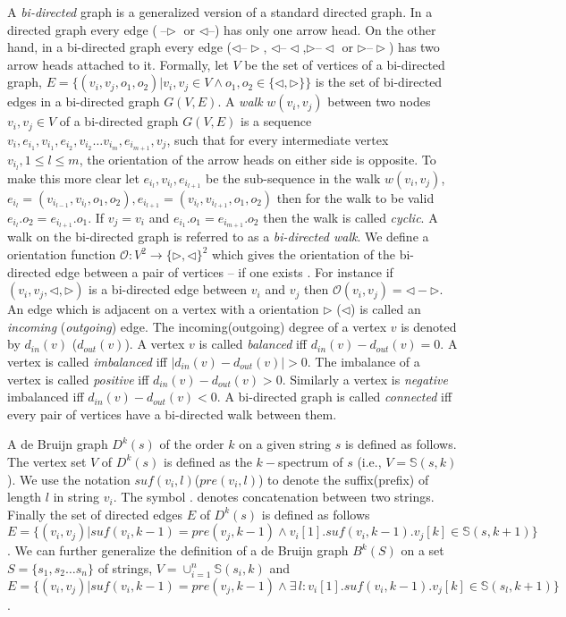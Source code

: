 \documentclass[runningheads]{llncs}
\begin{document}
A {\em bi-directed} graph is a generalized version of a standard directed graph. In a directed graph every 
edge ($\text{--}\rhd$ or $\lhd\text{--}$) has only one arrow head. On the other hand, in a bi-directed graph 
every edge ($\lhd\text{--}\rhd$, $\lhd\text{--}\lhd$,$\rhd\text{--}\lhd$ or $\rhd\text{--}\rhd$) has two arrow 
heads attached to it. Formally, let $V$ be the set of vertices of a bi-directed graph, $E = \{(v_i,v_j,o_1,o_2) | v_i,v_j\in V \wedge o_1,o_2\in\{\lhd,\rhd\}\}$ is the set of bi-directed edges in a bi-directed graph $G(V,E)$. 
A {\em walk} $w(v_i,v_j)$ between two nodes $v_i,v_j \in V$ of a bi-directed graph $G(V,E)$ is a
sequence $v_i,e_{i_1},v_{i_1},e_{i_2},v_{i_2}\ldots v_{i_m},e_{i_{m+1}},v_j$, such that for 
every intermediate vertex $v_{i_l},1\leq l \leq m$, the orientation of the arrow heads on either side is opposite. To make this more clear let $e_{i_l},v_{i_l},e_{i_{l+1}}$ be the sub-sequence in the walk $w(v_i,v_j)$,
$e_{i_l}=(v_{i_{l-1}},v_{i_l},o_1,o_2), e_{i_{l+1}} = (v_{i_{l}},v_{i_{l+1}},o_1,o_2)$
then for the walk to be valid $e_{i_l}.o_2 = e_{i_{l+1}}.o_1$. If $v_j = v_i$ and $e_{i_1}.o_1 = 
e_{i_{m+1}}.o_2$ then the walk is called {\em cyclic}. A walk on the bi-directed graph is referred to as
a {\em bi-directed walk}. We define a orientation function ${\mathcal O} : V^2 \rightarrow \{\rhd, \lhd\}^2$ which
gives the orientation of the bi-directed edge between a pair of vertices -- if one exists . 
For instance if $(v_i,v_j,\lhd,\rhd)$ is a bi-directed edge between $v_i$ and $v_j$ then 
${\mathcal O}(v_i,v_j) = \lhd-\rhd$. An edge which is adjacent on a vertex with a orientation 
$\rhd$ ($\lhd$) is called an {\em incoming} ({\em outgoing}) edge. The incoming(outgoing) degree 
of a vertex $v$ is denoted by $d_{in}(v)$ ($d_{out}(v)$). A vertex $v$ is called {\em balanced}
iff $d_{in}(v)-d_{out}(v)=0$. A vertex is called {\em imbalanced} 
iff $|d_{in}(v)-d_{out}(v)| >0$. The imbalance of a vertex is called {\em positive} 
iff $d_{in}(v)-d_{out}(v) > 0$. Similarly a vertex is {\em negative} imbalanced iff 
$d_{in}(v)-d_{out}(v)<0$. A bi-directed graph is called {\em connected} iff every pair of
vertices have a bi-directed walk between them.


A de Bruijn graph $D^k(s)$ of the order $k$ on a given string $s$ is defined as follows. The vertex set 
$V$ of $D^k(s)$ is defined as the $k-$spectrum of $s$ (i.e., $V = \mathbb{S}(s,k)$). We use the notation 
$suf(v_i,l)$($pre(v_i,l)$) to denote the suffix(prefix) of length $l$ in string $v_i$. The symbol $.$ denotes 
concatenation between two strings. Finally the set of directed edges $E$ of $D^k(s)$ is defined as follows 
$E = \{(v_i,v_j) | suf(v_i,k-1)=pre(v_j,k-1) \wedge v_i[1].suf(v_i,k-1).v_j[k] \in \mathbb{S}(s,k+1) \}$. 
We can further generalize the definition of a de Bruijn graph $B^k(S)$ on a set $S=\{s_1,s_2\ldots s_n\}$ 
of strings, $V = \displaystyle\cup_{i=1}^{n} \mathbb{S}(s_i,k)$ and $E = \{(v_i,v_j) | suf(v_i,k-1) = pre(v_j,k-1) \wedge \exists \, l : v_i[1].suf(v_i,k-1).v_j[k]\in \mathbb{S}(s_l,k+1)\}$.
\end{document}
